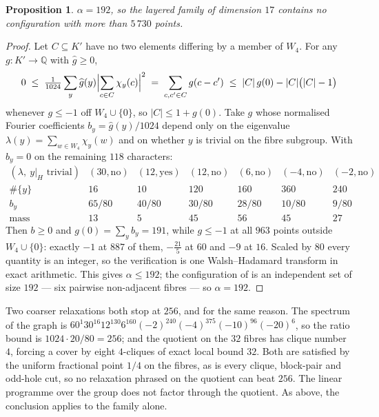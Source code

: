 \documentclass[11pt]{amsart}
\newtheorem{proposition}[theorem]{Proposition}
\theoremstyle{remark}
\newcommand{\Q}{\mathbb{Q}}
\begin{document}
\begin{proposition}\label{prop:d17}
$\alpha=192$, so the layered family of dimension $17$ contains no configuration
with more than $5\,730$ points.
\end{proposition}

\begin{proof}
Let $C\subseteq K'$ have no two elements differing by a member of $W_4$. For any
$g\colon K'\to\Q$ with $\widehat{g}\ge0$,
\[
  0\;\le\;\tfrac{1}{1024}\sum_{y}\widehat{g}(y)\Bigl|\sum_{c\in C}\chi_y(c)\Bigr|^{2}
   \;=\;\sum_{c,c'\in C}g(c-c')\;\le\;|C|\,g(0)-|C|\bigl(|C|-1\bigr)
\]
whenever $g\le-1$ off $W_4\cup\{0\}$, so $|C|\le 1+g(0)$. Take $g$ whose
normalised Fourier coefficients $b_y=\widehat{g}(y)/1024$ depend only on the
eigenvalue $\lambda(y)=\sum_{w\in W_4}\chi_y(w)$ and on whether $y$ is trivial on
the fibre subgroup. With $b_y=0$ on the remaining $118$ characters:
\setlength{\arraycolsep}{4pt}
\[
\begin{array}{c|cccccc}
(\lambda,\ y|_H\text{ trivial}) & (30,\text{no}) & (12,\text{yes}) & (12,\text{no})
  & (6,\text{no}) & (-4,\text{no}) & (-2,\text{no})\\ \hline
\#\{y\} & 16 & 10 & 120 & 160 & 360 & 240\\
b_y & 65/80 & 40/80 & 30/80 & 28/80 & 10/80 & 9/80\\
\text{mass} & 13 & 5 & 45 & 56 & 45 & 27
\end{array}
\]
\setlength{\arraycolsep}{5pt}
Then $b\ge0$ and $g(0)=\sum_y b_y=191$, while $g\le-1$ at all
$963$ points outside $W_4\cup\{0\}$: exactly $-1$ at $887$ of them, $-\tfrac{21}{5}$
at $60$ and $-9$ at $16$. Scaled by $80$ every quantity is an integer, so the
verification is one Walsh--Hadamard transform in exact arithmetic. This gives
$\alpha\le192$; the configuration of \cite{cohn-li2024} is an independent set of
size $192$ --- six pairwise non-adjacent fibres --- so $\alpha=192$.
\end{proof}

Two coarser relaxations both stop at $256$, and for the same reason. The spectrum
of the graph is $60^{1}30^{16}12^{130}6^{160}(-2)^{240}(-4)^{375}(-10)^{96}
(-20)^{6}$, so the ratio bound is $1024\cdot20/80=256$; and the quotient on the
$32$ fibres has clique number $4$, forcing a cover by eight $4$-cliques of exact
local bound $32$. Both are satisfied by the uniform fractional point $1/4$ on the
fibres, as is every clique, block-pair and odd-hole cut, so no relaxation phrased
on the quotient can beat $256$. The linear programme over the group does not
factor through the quotient. As above, the conclusion applies to the family
alone.
\end{document}
